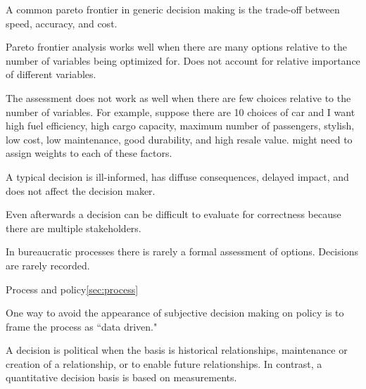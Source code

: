 A common pareto frontier in generic decision making is the trade-off between speed, accuracy, and cost. 

Pareto frontier analysis works well when there are many options relative to the number of variables being optimized for. Does not account for relative importance of different variables.

The assessment does not work as well when there are few choices relative to the number of variables. For example, suppose there are 10 choices of car and I want high fuel efficiency, high cargo capacity, maximum number of passengers, stylish, low cost, low maintenance, good durability, and high resale value. might need to assign weights to each of these factors. 

A typical decision is ill-informed, has diffuse consequences, delayed impact, and does not affect the decision maker. 

Even afterwards a decision can be difficult to evaluate for correctness because there are multiple stakeholders.

In bureaucratic processes there is rarely a formal assessment of options. 
Decisions are rarely recorded. 



Process and policy\ref{sec:process}

One way to avoid the appearance of subjective decision making on policy is to frame the process as ``data driven." 



A decision is political when the basis is historical relationships, maintenance or creation of a relationship, or to enable future relationships.
In contrast, a quantitative decision basis is based on measurements.


